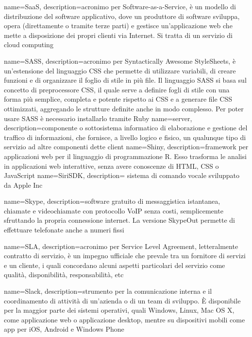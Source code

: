 
{
	name=SaaS,
	description={acronimo per Software-as-a-Service, è un modello di distribuzione del software applicativo, dove un produttore di software sviluppa, opera (direttamente o tramite terze parti) e gestisce un'applicazione web che mette a disposizione dei propri clienti via Internet. Si tratta di un servizio di cloud computing}
}

{
	name=SASS,
	description={acronimo per Syntactically Awesome StyleSheets, è un'estensione del linguaggio CSS che permette di utilizzare variabili, di creare funzioni e di organizzare il foglio di stile in più file. Il linguaggio SASS si basa sul concetto di preprocessore CSS, il quale serve a definire fogli di stile con una forma più semplice, completa e potente rispetto ai CSS e a generare file CSS ottimizzati, aggregando le strutture definite anche in modo complesso. Per poter usare SASS è necessario installarlo tramite Ruby}
}
{
	name=server,
	description={componente o sottosistema informatico di elaborazione e gestione del traffico di informazioni, che fornisce, a livello logico e fisico, un qualunque tipo di servizio ad altre componenti dette client}
}
{
	name=Shiny,
	description={framework per applicazioni web per il linguaggio di programmazione R. Esso trasforma le analisi in applicazioni web interattive, senza avere conoscenze di HTML, CSS o JavaScript}
}
{
	name=SiriSDK,
	description={ sistema di comando vocale sviluppato da Apple Inc}
}

{
	name=Skype,
	description={software gratuito di messaggistica istantanea, chiamate e videochiamate con protocollo VoIP senza costi, semplicemente sfruttando la propria connessione internet. La versione SkypeOut permette di effettuare telefonate anche a numeri fissi}
}

{
	name=SLA,
	description={acronimo per Service Level Agreement, letteralmente contratto di servizio, è un impegno ufficiale che prevale tra un fornitore di servizi e un cliente, i quali concordano alcuni aspetti particolari del servizio come qualità, disponibilità, responsabilità, etc}
}

{
	name=Slack,
	description={strumento per la comunicazione interna e il coordinamento di attività di un'azienda o di un team di sviluppo. \MakeUppercase{è} disponibile per la maggior parte dei sistemi operativi, quali Windows, Linux, Mac OS X, come applicazione web o applicazione desktop, mentre su dispositivi mobili come app per iOS, Android e Windows Phone}
}

